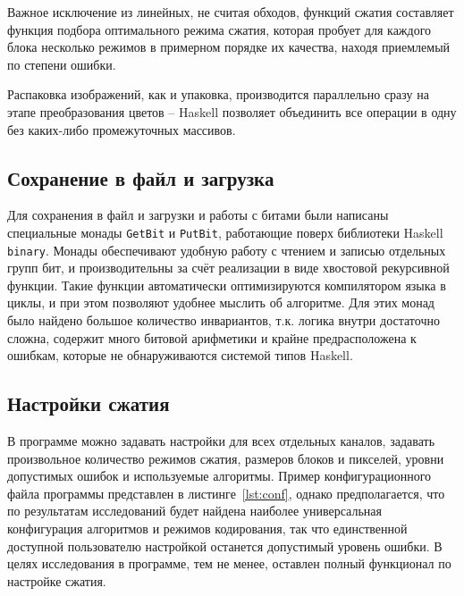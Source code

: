\documentclass[a4paper,12pt]{article}
\numberwithin{equation}{section}
\begin{document}
Важное исключение из линейных, не считая обходов, функций сжатия составляет
функция подбора оптимального режима сжатия, которая пробует для каждого блока
несколько режимов в примерном порядке их качества, находя приемлемый по степени
ошибки.

Распаковка изображений, как и упаковка, производится параллельно сразу на этапе
преобразования цветов -- Haskell позволяет объединить все операции в одну без
каких-либо промежуточных массивов.

\subsection{Сохранение в файл и загрузка}

Для сохранения в файл и загрузки и работы с битами были написаны специальные
монады \texttt{GetBit} и \texttt{PutBit}, работающие поверх библиотеки Haskell
\texttt{binary}. Монады обеспечивают удобную работу с чтением и записью
отдельных групп бит, и производительны за счёт реализации в виде хвостовой
рекурсивной функции. Такие функции автоматически оптимизируются компилятором
языка в циклы, и при этом позволяют удобнее мыслить об алгоритме. Для этих монад
было найдено большое количество инвариантов, т.к. логика внутри достаточно
сложна, содержит много битовой арифметики и крайне предрасположена к ошибкам,
которые не обнаруживаются системой типов Haskell.

\subsection{Настройки сжатия}

В программе можно задавать настройки для всех отдельных каналов, задавать
произвольное количество режимов сжатия, размеров блоков и пикселей, уровни
допустимых ошибок и используемые алгоритмы. Пример конфигурационного файла
программы представлен в листинге~\ref{lst:conf}, однако предполагается, что по
результатам исследований будет найдена наиболее универсальная конфигурация
алгоритмов и режимов кодирования, так что единственной доступной пользователю
настройкой останется допустимый уровень ошибки. В целях исследования в
программе, тем не менее, оставлен полный функционал по настройке сжатия.
\end{document}
